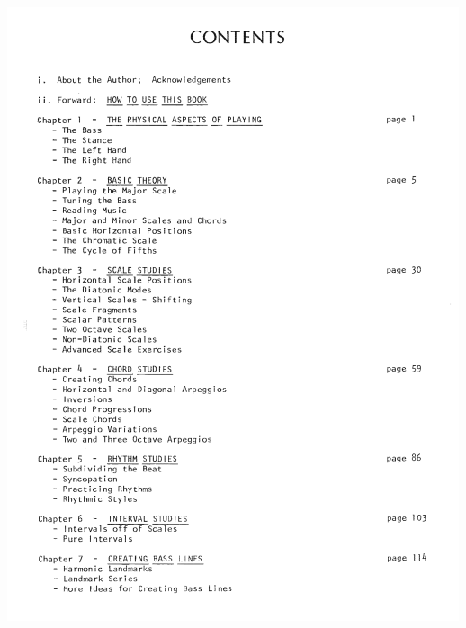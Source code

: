 \documentclass[a4paper]{book}
\begin{document}
\begin{center}
\includegraphics[width=13.28cm,height=18.043cm]{lebluessupportsmethodes-img148.png}
\end{center}
\end{document}
